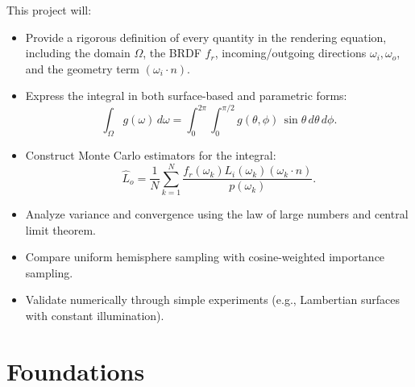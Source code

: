 \documentclass[12pt]{article}
\begin{document}
This project will:
\begin{itemize}
    \item Provide a rigorous definition of every quantity in the rendering equation, including the domain $\Omega$, the BRDF $f_r$, incoming/outgoing directions $\omega_i, \omega_o$, and the geometry term $(\omega_i \cdot n)$.
    \item Express the integral in both surface-based and parametric forms:
    \[
    \int_{\Omega} g(\omega)\, d\omega
    = \int_0^{2\pi}\int_0^{\pi/2} 
    g(\theta,\phi)\,
    \sin\theta\, d\theta\, d\phi.
    \]
    \item Construct Monte Carlo estimators for the integral:
    \[
    \hat{L}_o = \frac{1}{N}
    \sum_{k=1}^{N} 
    \frac{
        f_r(\omega_k)L_i(\omega_k)(\omega_k\cdot n)
    }{
        p(\omega_k)
    }.
    \]
    \item Analyze variance and convergence using the law of large numbers and central limit theorem.
    \item Compare uniform hemisphere sampling with cosine-weighted importance sampling.
    \item Validate numerically through simple experiments (e.g., Lambertian surfaces with constant illumination).
\end{itemize}


\section{Foundations}
\end{document}
